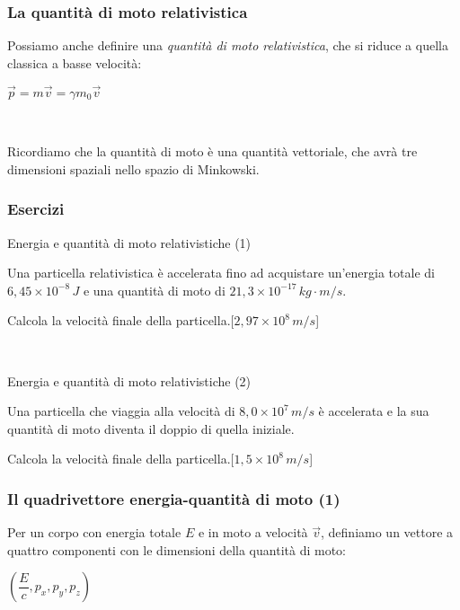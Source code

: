 \documentclass[]{beamer}
\theoremstyle{plain}
\begin{document}
\begin{frame}
\frametitle{La quantità di moto relativistica}
Possiamo anche definire una \emph{quantità di moto relativistica}, che si riduce a quella classica a basse velocità:
\begin{center}
\colorbox{blue!30}{$ \vec{p} = m \vec{v} = \gamma m_0 \vec{v}  $}
\end{center}\pause

~

Ricordiamo che la quantità di moto è una quantità vettoriale, che avrà tre dimensioni spaziali nello spazio di Minkowski.
\end{frame}







\begin{frame}
\frametitle{Esercizi}
\begin{exampleblock}{Energia e quantità di moto relativistiche (1)}
\small{
Una particella relativistica è accelerata fino ad acquistare un'energia totale di $ 6,45 \times 10^{-8} \, J $ e una quantità di moto di $ 21,3 \times 10^{-17} \, kg \cdot m/s $.

Calcola la velocità finale della particella.\hspace*{\fill}[$ 2,97 \times 10^{8} \, m/s $]
  }
\end{exampleblock}

~

\begin{exampleblock}{Energia e quantità di moto relativistiche (2)}
\small{
Una particella che viaggia alla velocità di $ 8,0 \times 10^{7} \, m/s $ è accelerata e la sua quantità di moto diventa il doppio di quella iniziale.

Calcola la velocità finale della particella.\hspace*{\fill}[$ 1,5 \times 10^{8} \, m/s $]
  }
\end{exampleblock}
\end{frame}



\begin{frame}
\frametitle{Il quadrivettore energia-quantità di moto (1)}
Per un corpo con energia totale $ E $ e in moto a velocità $ \vec{v} $, definiamo un vettore a quattro componenti con le dimensioni della quantità di moto:
\begin{center}
\colorbox{blue!30}{$ \left( \dfrac{E}{c} , p_x , p_y , p_z \right) $}
\end{center}
\end{frame}
\end{document}
